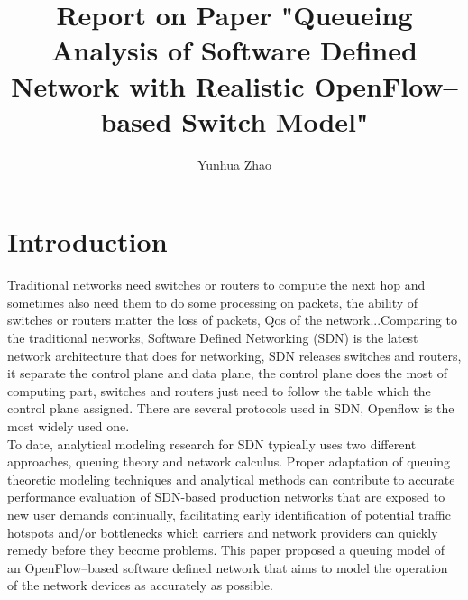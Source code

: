 \documentclass[12pt]{article}
\author{Yunhua Zhao}
\title{Report on Paper "Queueing Analysis of Software Defined Network with Realistic OpenFlow–based Switch Model"}
\begin{document}
\maketitle

\section*{Introduction}
Traditional networks need switches or routers to compute the next hop and sometimes also need them to do some processing on packets, the ability of switches or routers matter the loss of packets, Qos of the network...Comparing to the traditional networks, Software Defined Networking (SDN) is the latest network architecture that does for networking, SDN releases switches and routers, it separate the control plane and data plane, the control plane does the most of computing part, switches and routers just need to follow the table which the control plane assigned. There are several protocols used in SDN, Openflow is the most widely used one.\\
To date, analytical modeling research for SDN typically uses two different approaches, queuing theory and network calculus. Proper adaptation of queuing theoretic modeling techniques and analytical methods can contribute to accurate performance evaluation of SDN-based production networks that are exposed to new user demands continually, facilitating early identification of potential traffic hotspots and/or bottlenecks which carriers and network providers can quickly remedy before they become problems. This paper proposed a queuing model of an OpenFlow–based software defined network that aims to model the operation of the network devices as accurately as possible. \\
\end{document}
